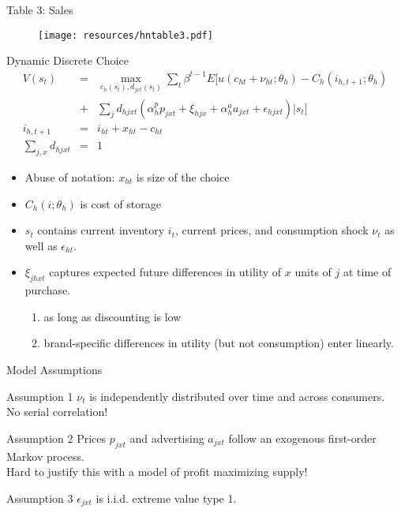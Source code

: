 \begin{frame}{Table 3: Sales}
\begin{figure}[htbp]
\begin{center}
\texttt{[image: resources/hntable3.pdf]}
\label{gandr1}
\end{center}
\end{figure}
\end{frame}


\begin{frame}{Dynamic Discrete Choice}
\begin{eqnarray*}
V(s_t)&=& \max_{c_h(s_t),d_{jxt}(s_t)} \sum_t \beta^{t-1} E[ u(c_{ht}+\nu_{ht}; \theta_h) - C_h(i_{h,t+1};\theta_h) \\
&+&\sum_j d_{hjxt} (\alpha_h^p p_{jxt} + \xi_{hjx} + \alpha_h^a a_{jxt} + \epsilon_{hjxt} )| s_t]\\
i_{h,t+1} &=& i_{ht} + x_{ht} - c_{ht}\\
\sum_{j,x} d_{hjxt} &=& 1
\end{eqnarray*}
\begin{itemize}
\item Abuse of notation: $x_{ht}$ is size of the choice
\item $C_h(i; \theta_h)$ is cost of storage
\item $s_t$ contains current inventory $i_t$, current prices, and consumption shock $\nu_t$ as well as $\epsilon_{ht}$.
\item $\xi_{jhxt}$ captures expected future differences in utility of $x$ units of $j$ at time of purchase.
\begin{enumerate}
\item as long as discounting is low
\item brand-specific differences in utility (but not consumption) enter linearly.
\end{enumerate}
\end{itemize}
\end{frame}

\begin{frame}{Model Assumptions}
\begin{block}{Assumption 1}
$\nu_t$ is independently distributed over time and across consumers.\\
 \alert{No serial correlation!}
\end{block}
\begin{block}{Assumption 2}
Prices $p_{jxt}$ and advertising $a_{jxt}$ follow an exogenous first-order Markov process.\\
\alert{Hard to justify this with a model of profit maximizing supply!}
\end{block}
\begin{block}{Assumption 3}
$\epsilon_{jxt}$ is i.i.d. extreme value type 1.
\end{block}
\end{frame}


